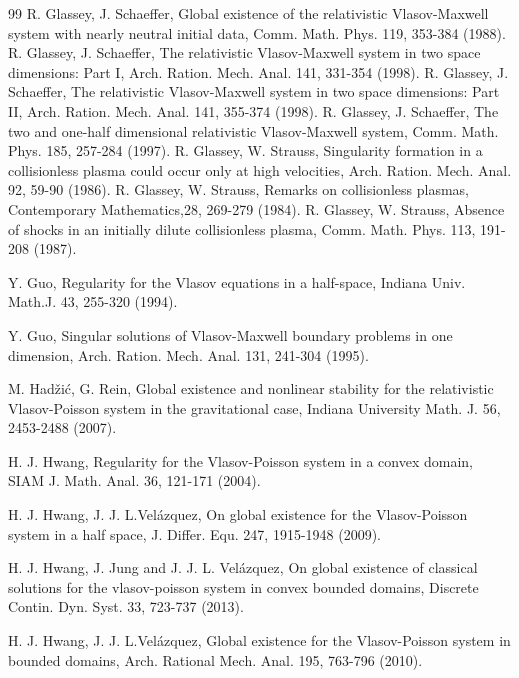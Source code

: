 \documentclass[11pt,reqno]{amsart}%
\theoremstyle{definition}
\theoremstyle{remark}
\begin{document}
\begin{thebibliography}{99}
R. Glassey, J. Schaeffer, Global existence of the relativistic Vlasov-Maxwell system with nearly neutral initial
data,  Comm. Math. Phys. 119, 353-384 (1988).
R. Glassey, J. Schaeffer, The relativistic Vlasov-Maxwell system in two space dimensions: Part I, Arch. Ration. Mech. Anal. 141, 331-354 (1998).
R. Glassey, J. Schaeffer, The relativistic Vlasov-Maxwell system in two space dimensions: Part II, Arch. Ration. Mech. Anal. 141, 355-374 (1998).
R. Glassey, J. Schaeffer, The two and one-half dimensional relativistic Vlasov-Maxwell system,  Comm. Math. Phys. 185, 257-284 (1997).
R. Glassey, W. Strauss, Singularity formation in a collisionless plasma could occur only at high velocities,
Arch. Ration. Mech. Anal. 92, 59-90 (1986).
 R. Glassey, W. Strauss, Remarks on collisionless plasmas, Contemporary Mathematics,28, 269-279 (1984).
R. Glassey, W. Strauss, Absence of shocks in an initially dilute collisionless plasma,  Comm. Math. Phys. 113, 191-208 (1987).

Y. Guo, Regularity for the Vlasov equations in a half-space, Indiana Univ. Math.J. 43, 255-320 (1994).

Y. Guo, Singular solutions of Vlasov-Maxwell boundary problems in one dimension,
Arch. Ration. Mech. Anal. 131, 241-304 (1995).

M.  Had\v{z}i\'{c}, G. Rein, Global existence and nonlinear stability for the relativistic Vlasov-Poisson system in the gravitational case,
Indiana University Math. J. 56,  2453-2488 (2007).

  H. J. Hwang, Regularity for the Vlasov-Poisson system in a convex domain, SIAM
J. Math. Anal. 36, 121-171 (2004).


  H. J. Hwang, J. J. L.Vel\'{a}zquez, On global existence  for the Vlasov-Poisson system in a half space, J. Differ. Equ. 247, 1915-1948 (2009).

  H. J. Hwang, J. Jung and J. J. L. Vel\'{a}zquez, On global existence of classical solutions for  the vlasov-poisson system in convex bounded domains,
  Discrete Contin. Dyn. Syst. 33, 723-737 (2013).


H. J. Hwang, J. J. L.Vel\'{a}zquez, Global existence for the Vlasov-Poisson
system in bounded domains, Arch. Rational Mech. Anal. 195, 763-796  (2010).



\end{thebibliography}
\end{document}
